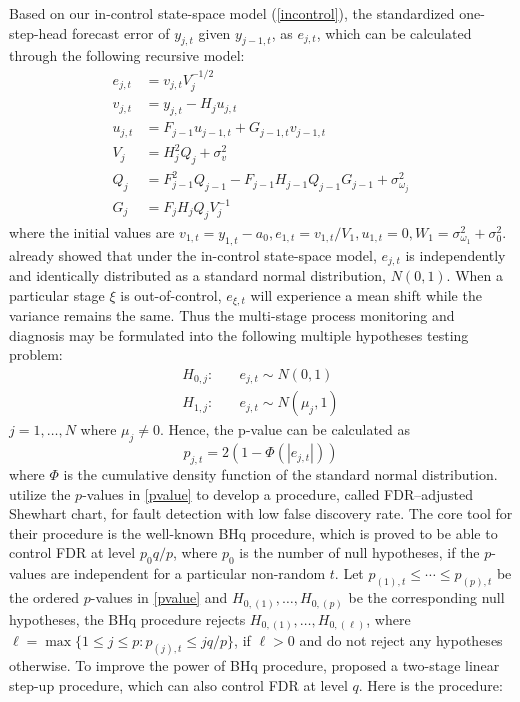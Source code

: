 \documentclass[a4paper,12pt]{article}
\begin{document}
Based on our in-control state-space model (\ref{incontrol}), the standardized one-step-head forecast error of $y_{j,t}$ given $y_{j-1,t}$, as $e_{j,t}$, which can be calculated through the following recursive model:
\begin{equation}\label{recur}
\begin{split}
e_{j,t} &= v_{j,t} V_j^{-1/2} \\
v_{j,t} &= y_{j,t} - H_j u_{j,t} \\
u_{j,t} &= F_{j-1} u_{j-1,t} + G_{j-1,t} v_{j-1,t} \\
V_j &= H_j^2 Q_j + \sigma^2_v \\
Q_j &= F_{j-1}^2 Q_{j-1} - F_{j-1} H_{j-1} Q_{j-1} G_{j-1} + \sigma^2_{\omega_j} \\
G_j &= F_j H_j Q_j V_j^{-1}
\end{split}
\end{equation}
where the initial values are $v_{1,t} = y_{1,t} - a_0, e_{1,t} = v_{1,t}/V_1, u_{1,t} = 0, W_1 = \sigma^2_{\omega_1} + \sigma_0^2$. \cite{durbin2012time} already showed that under the in-control state-space model, $e_{j,t}$ is independently and identically distributed as a standard normal distribution, $ N(0,1)$. When a particular stage $\xi$ is out-of-control, $e_{\xi,t}$ will experience a mean shift while the variance remains the same. Thus the multi-stage process monitoring and diagnosis may be formulated into the following multiple hypotheses testing problem:
\begin{equation}\label{hypo1}
\begin{split}
H_{0,j}: &\quad e_{j,t} \sim  N(0,1)\\ 
H_{1,j}: &\quad e_{j,t} \sim N(\mu_j,1)
\end{split}
\end{equation}
$j =1, \ldots, N$  where $\mu_j \ne 0$. Hence, the p-value can be calculated as
\begin{equation}\label{pvalue}
p_{j,t} = 2 \left ( 1 - \Phi(|e_{j,t}|)\right)
\end{equation}
where $\Phi$ is the cumulative density function of the standard normal distribution. \cite{li2009false} utilize the $p$-values in \eqref{pvalue} to develop a procedure, called FDR–adjusted Shewhart chart, for fault detection with low false discovery rate. The core tool for their procedure is the well-known BHq procedure, which is proved to be able to control FDR at level $p_0q/p$, where $p_0$ is the number of null hypotheses, if the $p$-values are independent for a particular non-random $t$. Let $p_{(1),t}\leq\cdots\leq  p_{(p),t}$ be the ordered $p$-values in \eqref{pvalue} and $H_{0,(1)},\ldots,H_{0,(p)}$ be the corresponding null hypotheses, the BHq procedure rejects $H_{0,(1)},\ldots,H_{0,(\ell)}$, where $\ell=\max\{1\leq j\leq p:p_{(j),t}\leq jq/p\}$, if $\ell>0$ and do not reject any hypotheses otherwise. To improve the power of BHq procedure, \cite{benjamini2006adaptive} proposed a two-stage linear step-up procedure, which can also control FDR at level $q$. Here is the procedure:
\end{document}
